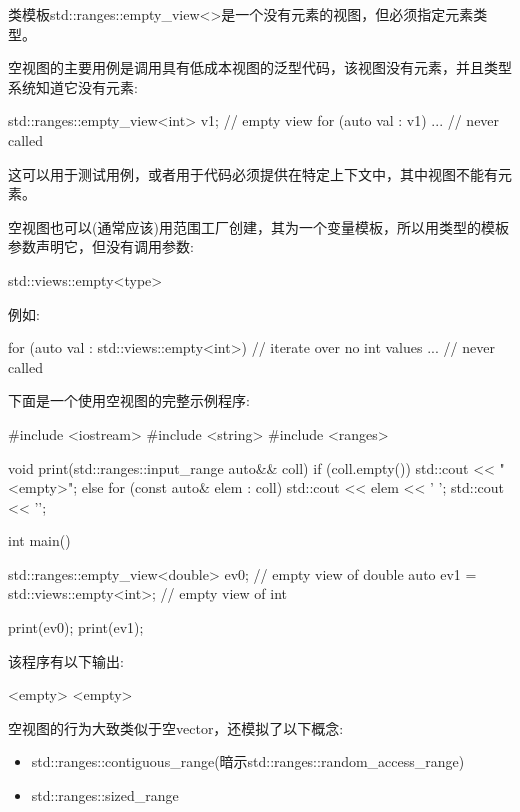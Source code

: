 类模板std::ranges::empty\_view<>是一个没有元素的视图，但必须指定元素类型。

空视图的主要用例是调用具有低成本视图的泛型代码，该视图没有元素，并且类型系统知道它没有元素:

\begin{cpp}
std::ranges::empty_view<int> v1; // empty view
for (auto val : v1) {
	... // never called
}
\end{cpp}

这可以用于测试用例，或者用于代码必须提供在特定上下文中，其中视图不能有元素。


空视图也可以(通常应该)用范围工厂创建，其为一个变量模板，所以用类型的模板参数声明它，但没有调用参数:

\begin{cpp}
std::views::empty<type>
\end{cpp}

例如:

\begin{cpp}
for (auto val : std::views::empty<int>) { // iterate over no int values
	... // never called
}
\end{cpp}

下面是一个使用空视图的完整示例程序:


\begin{cpp}
#include <iostream>
#include <string>
#include <ranges>

void print(std::ranges::input_range auto&& coll)
{
	if (coll.empty()) {
		std::cout << "<empty>\n";
	}
	else {
		for (const auto& elem : coll) {
			std::cout << elem << ' ';
		}
		std::cout << '\n';
	}
}

int main()
{
	std::ranges::empty_view<double> ev0; // empty view of double
	auto ev1 = std::views::empty<int>; // empty view of int
	
	print(ev0);
	print(ev1);
}
\end{cpp}

该程序有以下输出:

\begin{shell}
<empty>
<empty>
\end{shell}


空视图的行为大致类似于空vector，还模拟了以下概念:

\begin{itemize}
\item
std::ranges::contiguous\_range(暗示std::ranges::random\_access\_range)

\item
std::ranges::sized\_range
\end{itemize}

